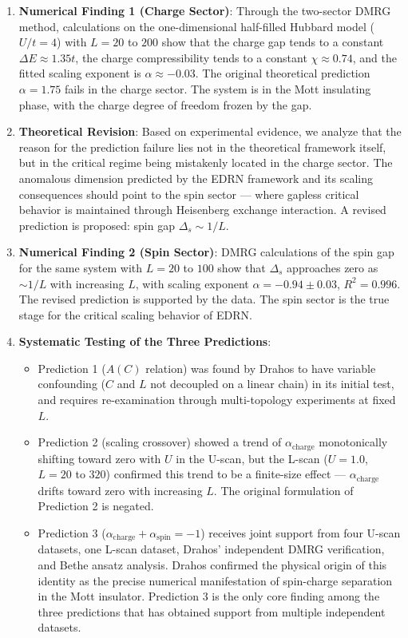 \documentclass[prb,reprint,twocolumn,superscriptaddress]{revtex4-2}
\begin{document}
\begin{enumerate}
\item \textbf{Numerical Finding 1 (Charge Sector)}: Through the two-sector DMRG method, calculations on the one-dimensional half-filled Hubbard model ($U/t = 4$) with $L = 20$ to $200$ show that the charge gap tends to a constant $\Delta E \approx 1.35t$, the charge compressibility tends to a constant $\chi \approx 0.74$, and the fitted scaling exponent is $\alpha \approx -0.03$. The original theoretical prediction $\alpha = 1.75$ fails in the charge sector. The system is in the Mott insulating phase, with the charge degree of freedom frozen by the gap.
\item \textbf{Theoretical Revision}: Based on experimental evidence, we analyze that the reason for the prediction failure lies not in the theoretical framework itself, but in the critical regime being mistakenly located in the charge sector. The anomalous dimension predicted by the EDRN framework and its scaling consequences should point to the spin sector --- where gapless critical behavior is maintained through Heisenberg exchange interaction. A revised prediction is proposed: spin gap $\Delta_s \sim 1/L$.
\item \textbf{Numerical Finding 2 (Spin Sector)}: DMRG calculations of the spin gap for the same system with $L = 20$ to $100$ show that $\Delta_s$ approaches zero as $\sim 1/L$ with increasing $L$, with scaling exponent $\alpha = -0.94 \pm 0.03$, $R^2 = 0.996$. The revised prediction is supported by the data. The spin sector is the true stage for the critical scaling behavior of EDRN.
\item \textbf{Systematic Testing of the Three Predictions}:
   \begin{itemize}
   \item Prediction 1 ($A(C)$ relation) was found by Drahos to have variable confounding ($C$ and $L$ not decoupled on a linear chain) in its initial test, and requires re-examination through multi-topology experiments at fixed $L$.
   \item Prediction 2 (scaling crossover) showed a trend of $\alpha_{\mathrm{charge}}$ monotonically shifting toward zero with $U$ in the U-scan, but the L-scan ($U = 1.0$, $L = 20$ to $320$) confirmed this trend to be a finite-size effect --- $\alpha_{\mathrm{charge}}$ drifts toward zero with increasing $L$. The original formulation of Prediction 2 is negated.
   \item Prediction 3 ($\alpha_{\mathrm{charge}} + \alpha_{\mathrm{spin}} = -1$) receives joint support from four U-scan datasets, one L-scan dataset, Drahos' independent DMRG verification, and Bethe ansatz analysis. Drahos confirmed the physical origin of this identity as the precise numerical manifestation of spin-charge separation in the Mott insulator. Prediction 3 is the only core finding among the three predictions that has obtained support from multiple independent datasets.

\end{itemize}
\end{enumerate}
\end{document}
